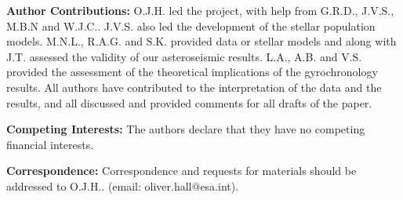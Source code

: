 \documentclass[12pt]{article}
\begin{document}
%

\textbf{Author Contributions:} O.J.H. led the project, with help from G.R.D., J.V.S., M.B.N and W.J.C.. J.V.S. also led the development of the stellar population models. M.N.L., R.A.G. and S.K. provided data or stellar models and along with J.T. assessed the validity of our asteroseismic results. L.A., A.B. and V.S. provided the assessment of the theoretical implications of the gyrochronology results. All authors have contributed to the interpretation of the data and the results, and all discussed and provided comments for all drafts of the paper.

\textbf{Competing Interests:} The authors declare that they have no competing financial interests.

\textbf{Correspondence:} Correspondence and requests for materials should be addressed to O.J.H.. (email: oliver.hall@esa.int).

\clearpage







\end{document}
